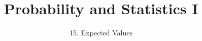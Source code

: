 

\usepackage[normalem]{ulem}
\usepackage{enumitem}

\newcommand{\lecturenum}{15}

\title[SS2857]{Probability and Statistics I}
\subtitle{\lecturenum. Expected Values}

\date{}






{

\begin{frame}
  \addtocounter{framenumber}{-1}

  \maketitle
\end{frame}
}


